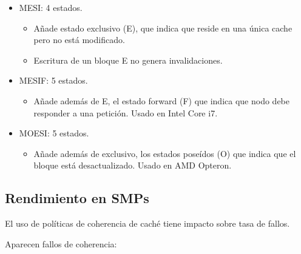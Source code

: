 \documentclass[12pt, twoside, openright]{report} %
\begin{document}
    \begin{itemize}
    
    \item
      MESI: 4 estados.

      \begin{itemize}
      
      \item
        Añade estado exclusivo (E), que indica que reside en una única
        cache pero no está modificado.
      \item
        Escritura de un bloque E no genera invalidaciones.
      \end{itemize}
    \item
      MESIF: 5 estados.

      \begin{itemize}
      
      \item
        Añade además de E, el estado forward (F) que indica que nodo
        debe responder a una petición. Usado en Intel Core i7.
      \end{itemize}
    \item
      MOESI: 5 estados.

      \begin{itemize}
      
      \item
        Añade además de exclusivo, los estados poseídos (O) que indica
        que el bloque está desactualizado. Usado en AMD Opteron.
      \end{itemize}
    \end{itemize}

\subsection{Rendimiento en SMPs}


    El uso de políticas de coherencia de caché tiene impacto sobre
    tasa de fallos.

    Aparecen fallos de coherencia:
\end{document}
